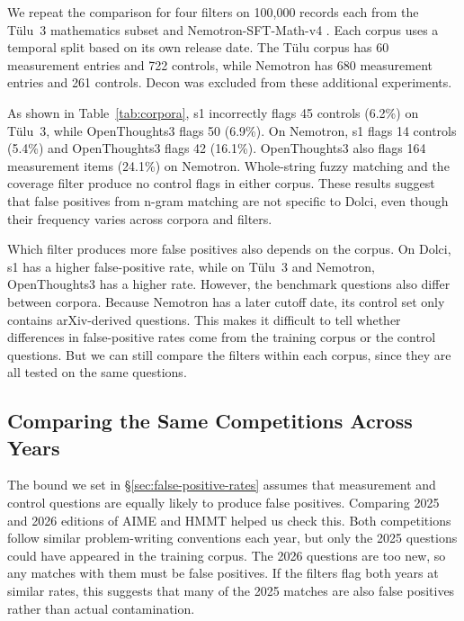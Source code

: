 \documentclass[11pt]{article}
\begin{document}
We repeat the comparison for four filters on 100,000 records each from the T\"ulu~3 mathematics subset and Nemotron-SFT-Math-v4 \citep{nemotron_sft_math_v4}. Each corpus uses a temporal split based on its own release date. The T\"ulu corpus has 60 measurement entries and 722 controls, while Nemotron has 680 measurement entries and 261 controls. Decon was excluded from these additional experiments.

As shown in Table~\ref{tab:corpora}, s1 incorrectly flags 45 controls (6.2\%) on T\"ulu~3, while OpenThoughts3 flags 50 (6.9\%). On Nemotron, s1 flags 14 controls (5.4\%) and OpenThoughts3 flags 42 (16.1\%). OpenThoughts3 also flags 164 measurement items (24.1\%) on Nemotron. Whole-string fuzzy matching and the coverage filter produce no control flags in either corpus. These results suggest that false positives from n-gram matching are not specific to Dolci, even though their frequency varies across corpora and filters.

Which filter produces more false positives also depends on the corpus. On Dolci, s1 has a higher false-positive rate, while on T\"ulu~3 and Nemotron, OpenThoughts3 has a higher rate. However, the benchmark questions also differ between corpora. Because Nemotron has a later cutoff date, its control set only contains arXiv-derived questions. This makes it difficult to tell whether differences in false-positive rates come from the training corpus or the control questions. But we can still compare the filters within each corpus, since they are all tested on the same questions.

\subsection{Comparing the Same Competitions Across Years}
\label{sec:matched}

The bound we set in \S\ref{sec:false-positive-rates} assumes that measurement and control questions are equally likely to produce false positives. Comparing 2025 and 2026 editions of AIME and HMMT helped us check this. Both competitions follow similar problem-writing conventions each year, but only the 2025 questions could have appeared in the training corpus. The 2026 questions are too new, so any matches with them must be false positives. If the filters flag both years at similar rates, this suggests that many of the 2025 matches are also false positives rather than actual contamination.
\end{document}
